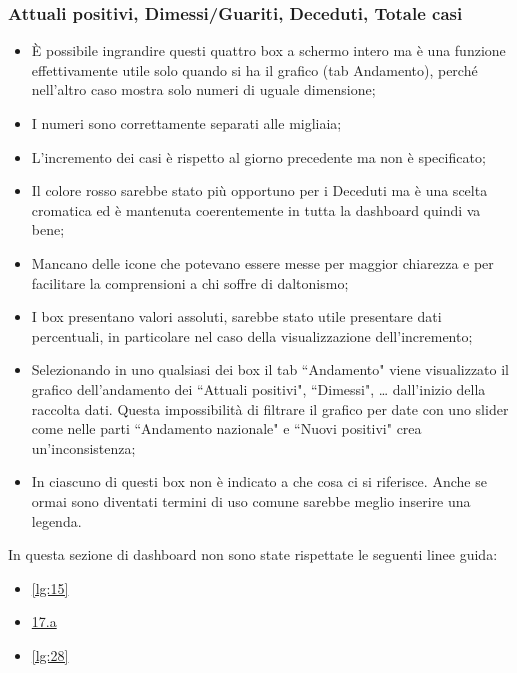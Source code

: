 \subsubsection{Attuali positivi, Dimessi/Guariti, Deceduti, Totale casi}
\begin{itemize}
    \item \`E possibile ingrandire questi quattro box a schermo intero ma è una funzione effettivamente utile solo quando si ha il grafico (tab Andamento), perché nell'altro caso mostra solo numeri di uguale dimensione;
    \item I numeri sono correttamente separati alle migliaia;
    \item L'incremento dei casi è rispetto al giorno precedente ma non è specificato;
    \item Il colore rosso sarebbe stato più opportuno per i Deceduti ma è una scelta cromatica ed è mantenuta coerentemente in tutta la dashboard quindi va bene;
    \item Mancano delle icone che potevano essere messe per maggior chiarezza e per facilitare la comprensioni a chi soffre di daltonismo;
    \item I box presentano valori assoluti, sarebbe stato utile presentare dati percentuali, in particolare nel caso della visualizzazione dell'incremento;
    \item Selezionando in uno qualsiasi dei box il tab ``Andamento" viene visualizzato il grafico dell'andamento dei ``Attuali positivi", ``Dimessi", … dall'inizio della raccolta dati. Questa impossibilità di filtrare il grafico per date con uno slider come nelle parti ``Andamento nazionale" e ``Nuovi positivi" crea un'inconsistenza;
    \item In ciascuno di questi box non è indicato a che cosa ci si riferisce. Anche se ormai sono diventati termini di uso comune sarebbe meglio inserire una legenda.
\end{itemize}
In questa sezione di dashboard non sono state rispettate le seguenti linee guida:
\begin{itemize}
    \item \ref{lg:15}
    \item \hyperref[lg:17.a]{17.a}
    \item \ref{lg:28}
\end{itemize}

